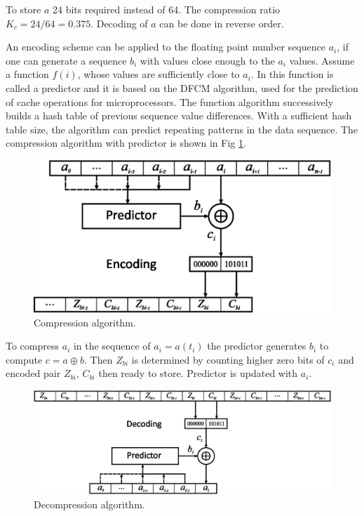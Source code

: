 \documentclass[conference]{IEEEtran}
\begin{document}
To store \(a\) 24 bits required instead of 64. The compression ratio \(K_c=24/64=0.375\). 
Decoding of \(a\) can be done in reverse order.

An encoding scheme can be applied to the floating point number sequence \(a_i\), if one can generate a sequence \(b_i\)
with values close enough to the \(a_i\) values. Assume a function \(f(i)\), whose values are sufficiently close to \(a_i\).
In \cite{ratana06} this function is called a predictor and it is based on the DFCM algorithm, used for the prediction of cache operations for microprocessors. The function algorithm successively builds a hash table of previous sequence value differences. 
With a sufficient hash table size, the algorithm can predict repeating patterns in the data sequence. The compression algorithm with predictor is shown in Fig \ref{fig_compr}.

\begin{figure}[htbp]
	\centering
	\includegraphics[width=0.8\columnwidth]{fig1.eps}
	\caption{Compression algorithm.}
	\label{fig_compr}
\end{figure}

To compress \(a_i\) in the sequence of \(a_i=a(t_i)\) the predictor generates \(b_i\) to compute 
\(c=a \oplus b \). 
Then \(Z_{bi}\) is determined by counting higher zero bits of \(c_i\) and encoded pair \(Z_{bi}\), \(C_{bi}\) then ready to store.
Predictor is updated with \(a_i\).

\begin{figure}[htbp]
	\centering
	\includegraphics[width=0.8\columnwidth]{fig2.eps}
	\caption{Decompression algorithm.}
	\label{fig_decompr}
\end{figure}
\end{document}
